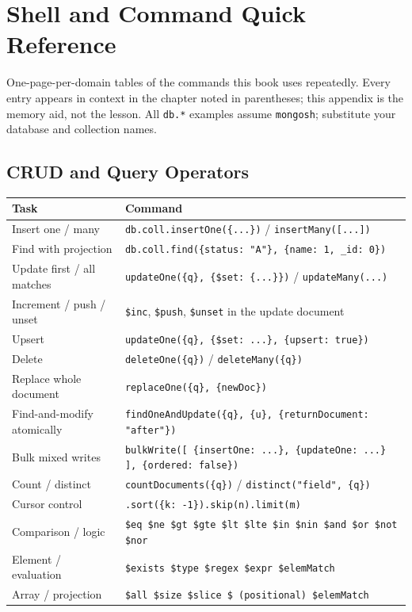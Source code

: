\chapter{Shell and Command Quick Reference}
%
One-page-per-domain tables of the commands this book uses repeatedly. Every entry appears in
context in the chapter noted in parentheses; this appendix is the memory aid, not the lesson.
All \texttt{db.*} examples assume \texttt{mongosh}; substitute your database and collection names.

\section{CRUD and Query Operators}
%
\begin{center}
\footnotesize
\begin{tabular}{@{}p{4.6cm}p{8.2cm}@{}}
\toprule
\textbf{Task} & \textbf{Command} \\
\midrule
Insert one / many & \texttt{db.coll.insertOne(\{...\})} / \texttt{insertMany([...])} \\
Find with projection & \texttt{db.coll.find(\{status: "A"\}, \{name: 1, \_id: 0\})} \\
Update first / all matches & \texttt{updateOne(\{q\}, \{\$set: \{...\}\})} / \texttt{updateMany(...)} \\
Increment / push / unset & \texttt{\$inc}, \texttt{\$push}, \texttt{\$unset} in the update document \\
Upsert & \texttt{updateOne(\{q\}, \{\$set: ...\}, \{upsert: true\})} \\
Delete & \texttt{deleteOne(\{q\})} / \texttt{deleteMany(\{q\})} \\
Replace whole document & \texttt{replaceOne(\{q\}, \{newDoc\})} \\
Find-and-modify atomically & \texttt{findOneAndUpdate(\{q\}, \{u\}, \{returnDocument: "after"\})} \\
Bulk mixed writes & \texttt{bulkWrite([ \{insertOne: ...\}, \{updateOne: ...\} ], \{ordered: false\})} \\
Count / distinct & \texttt{countDocuments(\{q\})} / \texttt{distinct("field", \{q\})} \\
Cursor control & \texttt{.sort(\{k: -1\}).skip(n).limit(m)} \\
Comparison / logic & \texttt{\$eq \$ne \$gt \$gte \$lt \$lte \$in \$nin \$and \$or \$not \$nor} \\
Element / evaluation & \texttt{\$exists \$type \$regex \$expr \$elemMatch} \\
Array / projection & \texttt{\$all \$size \$slice \$ (positional) \$elemMatch} \\
\bottomrule
\end{tabular}
\end{center}

